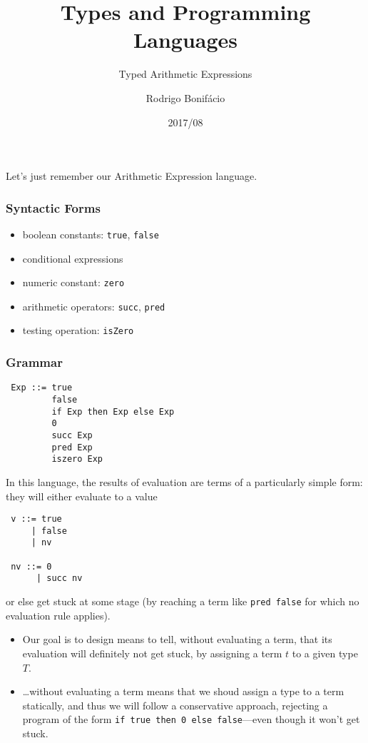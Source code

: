 \documentclass{beamer}
\title{Types and Programming Languages}
\subtitle{Typed Arithmetic Expressions}
\author{Rodrigo Bonif\'{a}cio}
\date{2017/08}
\begin{document}
\begin{frame}
\titlepage
\end{frame}

\begin{frame}

Let's just remember our {\color{blue}Arithmetic Expression}
language. 

\end{frame}

\begin{frame}
\frametitle{Syntactic Forms} 

\begin{itemize}
\item boolean constants: \texttt{true}, \texttt{false}
\item conditional expressions
\item numeric constant: \texttt{zero}
\item arithmetic operators: \texttt{succ}, \texttt{pred}
\item testing operation: \texttt{isZero} 
\end{itemize}
\end{frame}

\begin{frame}[fragile]
\frametitle{Grammar} 

\begin{verbatim}
 Exp ::= true
         false 
         if Exp then Exp else Exp
         0
         succ Exp
         pred Exp
         iszero Exp
\end{verbatim}
\end{frame}

\begin{frame}[fragile]
In this language, the results of evaluation
are terms of a particularly simple form: they will 
either evaluate to a value 

\begin{verbatim}
 v ::= true 
     | false 
     | nv

 nv ::= 0
      | succ nv 
\end{verbatim}

or else get {\color{blue}stuck} at some stage (by 
reaching a term like \texttt{pred false} for which 
no evaluation rule applies). 
\end{frame}

\begin{frame}
\begin{itemize}
\item Our goal is to design means to tell, without evaluating 
a term, that its evaluation will definitely not get stuck, 
by assigning a term $t$ to a given type $T$.  \pause 

\item {\color{blue}\ldots without evaluating a term} means that 
we shoud assign a type to a term {\color{blue}statically}, 
and thus we will follow a conservative approach, rejecting 
a program of the form \texttt{if true then 0 else false}---even though 
it won't get stuck. 
\end{itemize}
\end{frame}
\end{document}
